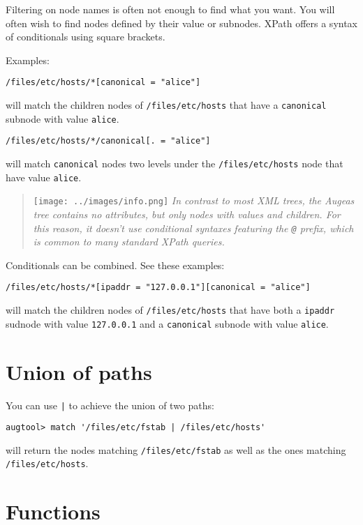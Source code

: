 Filtering on node names is often not enough to find what you want. You will often wish to find nodes defined by their value or subnodes. XPath offers a syntax of conditionals using square brackets.

Examples:

\begin{verbatim}
/files/etc/hosts/*[canonical = "alice"]
\end{verbatim}
will match the children nodes of \verb!/files/etc/hosts! that have a \verb!canonical! subnode with value \verb!alice!.

\begin{verbatim}
/files/etc/hosts/*/canonical[. = "alice"]
\end{verbatim}
will match \verb!canonical! nodes two levels under the \verb!/files/etc/hosts! node that have value \verb!alice!.

\begin{quote}
\texttt{[image: ../images/info.png]} \emph{In contrast to most XML trees, the Augeas tree contains no attributes, but only nodes with values and children. For this reason, it doesn't use conditional syntaxes featuring the \texttt{@} prefix, which is common to many standard XPath queries.}

\end{quote}
Conditionals can be combined. See these examples:

\begin{verbatim}
/files/etc/hosts/*[ipaddr = "127.0.0.1"][canonical = "alice"]
\end{verbatim}
will match the children nodes of \verb!/files/etc/hosts! that have both a \verb!ipaddr! sudnode with value \verb!127.0.0.1! and a \verb!canonical! subnode with value \verb!alice!.

\section{Union of paths}

You can use \verb!|! to achieve the union of two paths:

\begin{verbatim}
augtool> match '/files/etc/fstab | /files/etc/hosts'
\end{verbatim}
will return the nodes matching \verb!/files/etc/fstab! as well as the ones matching \verb!/files/etc/hosts!.

\section{Functions}

